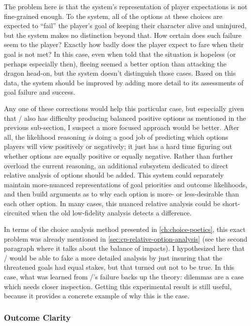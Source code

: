 The problem here is that the system's representation of player expectations is not fine-grained enough.
%
To the system, all of the options at these choices are expected to ``fail'' the player's goal of keeping their character alive and uninjured, but the system makes no distinction beyond that.
%
How certain does such failure seem to the player?
%
Exactly how badly does the player expect to fare when their goal is not met?
%
In this case, even when told that the situation is hopeless (or perhaps especially then), fleeing seemed a better option than attacking the dragon head-on, but the system doesn't distinguish those cases.
%
Based on this data, the system should be improved by adding more detail to its assessments of goal failure and success.


Any one of these corrections would help this particular case, but especially given that \dunyazad/ also has difficulty producing balanced positive options as mentioned in the previous sub-section, I suspect a more focused approach would be better.
%
After all, the likelihood reasoning \emph{is} doing a good job of predicting which options players will view positively or negatively; it just has a hard time figuring out whether options are equally positive or equally negative.
%
Rather than further overload the current reasoning, an additional subsystem dedicated to direct relative analysis of options should be added.
%
This system could separately maintain more-nuanced representations of goal priorities and outcome likelihoods, and then build arguments as to why each option is more- or less-desirable than each other option.
%
In many cases, this nuanced relative analysis could be short-circuited when the old low-fidelity analysis detects a difference.


In terms of the choice analysis method presented in \cref{ch:choice-poetics}, this exact problem was already mentioned in \cref{sec:cp-relative-option-analysis} (see the second paragraph where it talks about the balance of impacts).
%
I hypothesized here that \dunyazad/ would be able to fake a more detailed analysis by just insuring that the threatened goals had equal stakes, but that turned out not to be true.
%
In this case, what was learned from \dunyazad/'s failure backs up the theory: dilemmas are a case which needs closer inspection.
%
Getting this experimental result is still useful, because it provides a concrete example of why this is the case.


\subsubsection{Outcome Clarity}


